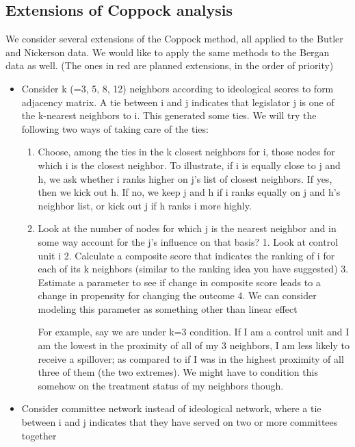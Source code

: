 \documentclass[12pt]{article}
\begin{document}
\subsection{Extensions of Coppock analysis}

We consider several extensions of the Coppock method, all applied to the Butler and Nickerson data. We would like to apply the same methods to the Bergan data as well. (The ones in red are planned extensions, in the order of priority)

\begin{itemize}

\item Consider k (=3, 5, 8, 12) neighbors according to ideological scores to form adjacency matrix. A tie between i and j indicates that legislator j is one of the k-nearest neighbors to i. This generated some ties. We will try the following two ways of taking care of the ties:

\color{red}
\begin{enumerate}
\item Choose, among the ties in the k closest neighbors for i, those nodes for which i is the closest neighbor. To illustrate, if i is equally close to j and h, we ask whether i ranks higher on j's list of closest neighbors. If yes, then we kick out h. If no, we keep j and h if i ranks equally on j and h's neighbor list, or kick out j if h ranks i more highly.

\item Look at the number of nodes for which j is the nearest neighbor and in some way account for the j's influence on that basis? 
1. Look at control unit i
2. Calculate a composite score that indicates the ranking of i for each of its k neighbors (similar to the ranking idea you have suggested)
3. Estimate a parameter to see if change in composite score leads to a change in propensity for changing the outcome
4. We can consider modeling this parameter as something other than linear effect

For example, say we are under k=3 condition. If I am a control unit and I am the lowest in the proximity of all of my 3 neighbors, I am less likely to receive a spillover; as compared to if I was in the highest proximity of all three of them (the two extremes). We might have to condition this somehow on the treatment status of my neighbors though.

\end{enumerate}

\color{black}
\item Consider committee network instead of ideological network, where a tie between i and j indicates that they have served on two or more committees together


\end{itemize}
\end{document}
